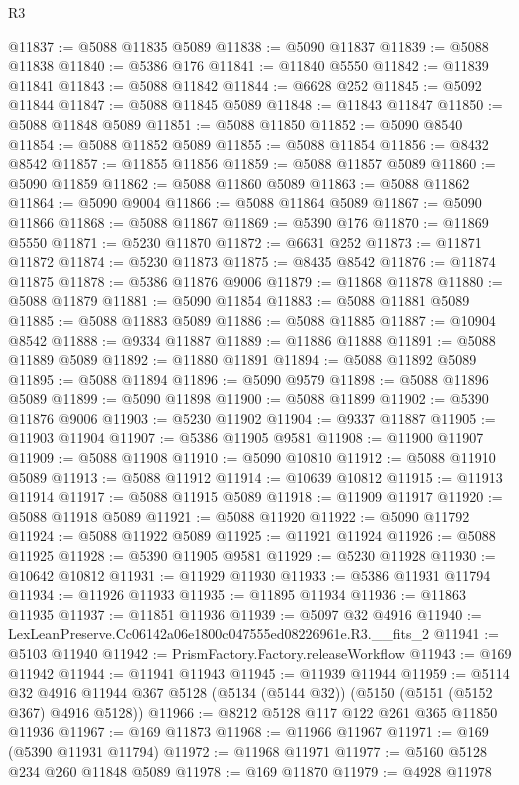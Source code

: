 \begin{lexlean}{R3}
\begin{coremodule}
@11837 := @5088 @11835 @5089
@11838 := @5090 @11837
@11839 := @5088 @11838
@11840 := @5386 @176
@11841 := @11840 @5550
@11842 := @11839 @11841
@11843 := @5088 @11842
@11844 := @6628 @252
@11845 := @5092 @11844
@11847 := @5088 @11845 @5089
@11848 := @11843 @11847
@11850 := @5088 @11848 @5089
@11851 := @5088 @11850
@11852 := @5090 @8540
@11854 := @5088 @11852 @5089
@11855 := @5088 @11854
@11856 := @8432 @8542
@11857 := @11855 @11856
@11859 := @5088 @11857 @5089
@11860 := @5090 @11859
@11862 := @5088 @11860 @5089
@11863 := @5088 @11862
@11864 := @5090 @9004
@11866 := @5088 @11864 @5089
@11867 := @5090 @11866
@11868 := @5088 @11867
@11869 := @5390 @176
@11870 := @11869 @5550
@11871 := @5230 @11870
@11872 := @6631 @252
@11873 := @11871 @11872
@11874 := @5230 @11873
@11875 := @8435 @8542
@11876 := @11874 @11875
@11878 := @5386 @11876 @9006
@11879 := @11868 @11878
@11880 := @5088 @11879
@11881 := @5090 @11854
@11883 := @5088 @11881 @5089
@11885 := @5088 @11883 @5089
@11886 := @5088 @11885
@11887 := @10904 @8542
@11888 := @9334 @11887
@11889 := @11886 @11888
@11891 := @5088 @11889 @5089
@11892 := @11880 @11891
@11894 := @5088 @11892 @5089
@11895 := @5088 @11894
@11896 := @5090 @9579
@11898 := @5088 @11896 @5089
@11899 := @5090 @11898
@11900 := @5088 @11899
@11902 := @5390 @11876 @9006
@11903 := @5230 @11902
@11904 := @9337 @11887
@11905 := @11903 @11904
@11907 := @5386 @11905 @9581
@11908 := @11900 @11907
@11909 := @5088 @11908
@11910 := @5090 @10810
@11912 := @5088 @11910 @5089
@11913 := @5088 @11912
@11914 := @10639 @10812
@11915 := @11913 @11914
@11917 := @5088 @11915 @5089
@11918 := @11909 @11917
@11920 := @5088 @11918 @5089
@11921 := @5088 @11920
@11922 := @5090 @11792
@11924 := @5088 @11922 @5089
@11925 := @11921 @11924
@11926 := @5088 @11925
@11928 := @5390 @11905 @9581
@11929 := @5230 @11928
@11930 := @10642 @10812
@11931 := @11929 @11930
@11933 := @5386 @11931 @11794
@11934 := @11926 @11933
@11935 := @11895 @11934
@11936 := @11863 @11935
@11937 := @11851 @11936
@11939 := @5097 @32 @4916
@11940 := LexLeanPreserve.Cc06142a06e1800c047555ed08226961e.R3.__fits_2
@11941 := @5103 @11940
@11942 := PrismFactory.Factory.releaseWorkflow
@11943 := @169 @11942
@11944 := @11941 @11943
@11945 := @11939 @11944
@11959 := @5114
    @32
    @4916
    @11944
    @367
    @5128
    (@5134 (@5144 @32))
    (@5150 (@5151 (@5152 @367) @4916 @5128))
@11966 := @8212 @5128 @117 @122 @261 @365 @11850 @11936
@11967 := @169 @11873
@11968 := @11966 @11967
@11971 := @169 (@5390 @11931 @11794)
@11972 := @11968 @11971
@11977 := @5160 @5128 @234 @260 @11848 @5089
@11978 := @169 @11870
@11979 := @4928 @11978

\end{coremodule}
\end{lexlean}
